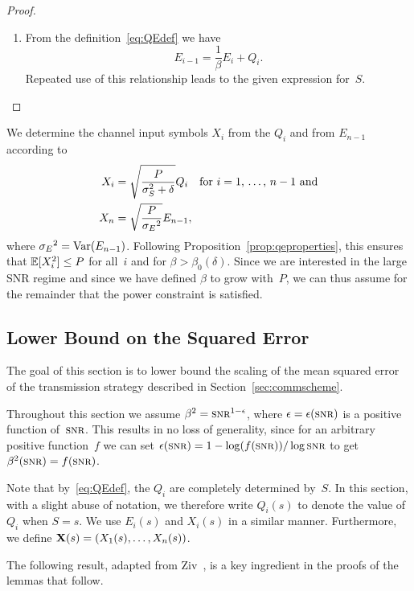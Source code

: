 \goodbreak
\begin{proof}
  \begin{enumerate}
    \item From the definition~\eqref{eq:QEdef} we have
    \begin{equation}
      \label{eq:reverserec}
      E_{i-1} = \frac{1}{\beta} E_i + Q_i.
    \end{equation}
    Repeated use of this relationship leads to the given expression for~$S$. 
  \end{enumerate}
\end{proof}

We determine the channel input symbols $X_i$ from the $Q_i$ and from $E_{n-1}$
according to 
\begin{align}
  X_i &= \sqrt{\frac{P}{{\sigma_S^2} + \delta}} Q_i \quad
  \text{for $i = 1$, \dots, $n-1$ and} \nonumber\\
  X_n &= \sqrt{\frac{P}{{{\sigma_E}^2}}} E_{n-1},
  \label{eq:Xdef}
\end{align}
where ${{\sigma_E}^2} = \operatorname{Var}(E_{n-1})$.  Following Proposition~\ref{prop:qeproperties},
this ensures that $\mathbb{E}[X_i^2] \le P$ for all~$i$ and for $\beta >
\beta_0(\delta)$.  Since we are interested in the large SNR regime and since we
have defined $\beta$ to grow with~$P$, we can thus assume for the remainder that
the power constraint is satisfied. 


\subsection{Lower Bound on the Squared Error}\label{sec:scalarlowerbound}

The goal of this section is to lower bound the scaling of the mean squared error
of the transmission strategy described in Section~\ref{sec:commscheme}.

Throughout this section we assume $\beta^2 = \snr^{1-\e}$, where $\e = \e(\snr)$
is a positive function of~$\snr$. This results in no loss of generality, since
for an arbitrary positive function~$f$ we can set $\e(\snr) =
1-\log(f(\snr))/\log\snr$ to get $\beta^2(\snr) = f(\snr)$.

Note that by~\eqref{eq:QEdef}, the $Q_i$ are completely determined by~$S$.
In this section, with a slight abuse of notation, we therefore write $Q_i(s)$ to
denote the value of~$Q_i$ when $S = s$. We use $E_i(s)$ and $X_i(s)$ in a
similar manner. Furthermore, we define $\mathbf{X}(s) = (X_1(s), \dots, X_n(s))$.

The following result, adapted from Ziv~\cite{Ziv1970}, is a key ingredient in
the proofs of the lemmas that follow.

